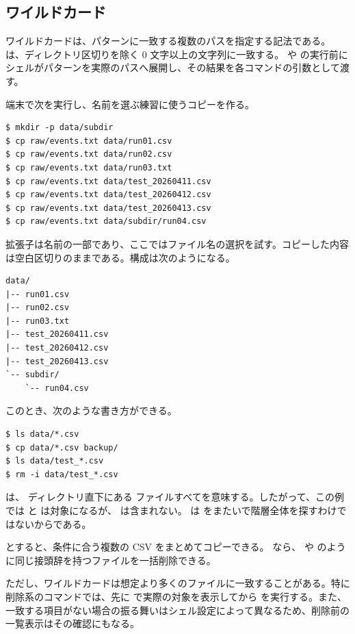 \subsection{ワイルドカード}

ワイルドカードは、パターンに一致する複数のパスを指定する記法である。\code{*} は、ディレクトリ区切りを除く 0 文字以上の文字列に一致する。 や  の実行前にシェルがパターンを実際のパスへ展開し、その結果を各コマンドの引数として渡す。

端末で次を実行し、名前を選ぶ練習に使うコピーを作る。

\begin{lstlisting}[numbers=none, xleftmargin=2\zw]
$ mkdir -p data/subdir
$ cp raw/events.txt data/run01.csv
$ cp raw/events.txt data/run02.csv
$ cp raw/events.txt data/run03.txt
$ cp raw/events.txt data/test_20260411.csv
$ cp raw/events.txt data/test_20260412.csv
$ cp raw/events.txt data/test_20260413.csv
$ cp raw/events.txt data/subdir/run04.csv
\end{lstlisting}

拡張子は名前の一部であり、ここではファイル名の選択を試す。コピーした内容は空白区切りのままである。構成は次のようになる。

\begin{lstlisting}[numbers=none, xleftmargin=2\zw]
data/
|-- run01.csv
|-- run02.csv
|-- run03.txt
|-- test_20260411.csv
|-- test_20260412.csv
|-- test_20260413.csv
`-- subdir/
    `-- run04.csv
\end{lstlisting}

このとき、次のような書き方ができる。

\begin{lstlisting}[numbers=none, xleftmargin=2\zw]
$ ls data/*.csv
$ cp data/*.csv backup/
$ ls data/test_*.csv
$ rm -i data/test_*.csv
\end{lstlisting}

 は、 ディレクトリ直下にある  ファイルすべてを意味する。したがって、この例では  と  は対象になるが、 は含まれない。\code{*} は \code{/} をまたいで階層全体を探すわけではないからである。

 とすると、条件に合う複数の CSV をまとめてコピーできる。 なら、 や  のように同じ接頭辞を持つファイルを一括削除できる。

ただし、ワイルドカードは想定より多くのファイルに一致することがある。特に削除系のコマンドでは、先に  で実際の対象を表示してから  を実行する。また、一致する項目がない場合の振る舞いはシェル設定によって異なるため、削除前の一覧表示はその確認にもなる。


